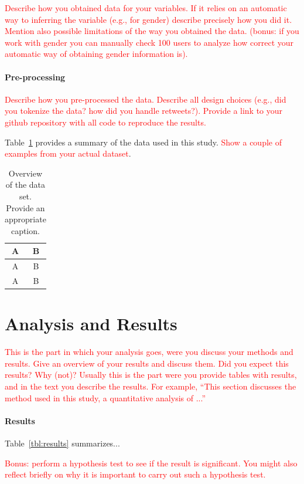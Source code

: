 \documentclass[11pt]{article}
\begin{document}
\textcolor{red}{Describe how you obtained data for your variables. If it relies on an automatic way to inferring the variable (e.g., for gender) describe precisely how you did it. Mention also possible limitations of the way you obtained the data. (bonus: if you work with gender you can manually check 100 users to analyze how correct your automatic way of obtaining gender information is).}

\paragraph{Pre-processing} \textcolor{red}{Describe how you pre-processed the data. Describe all design choices (e.g., did you tokenize the data? how did you handle retweets?). Provide a link to your github repository with all code to reproduce the results.}

Table~\ref{tbl:stats} provides a summary of the data used in this study.  \textcolor{red}{Show a couple of examples from your actual dataset}.
\begin{table}[hbtp]\centering
\begin{tabular}{|cc|}
\hline
A & B \\
\hline
A & B \\
A & B \\
\hline
\end{tabular}
\caption{Overview of the data set. Provide an appropriate caption.}
\label{tbl:stats}
\end{table}




\section{Analysis and Results}



\textcolor{red}{This is the part in which your analysis goes, were you discuss your methods and results. Give an overview of your results and discuss them. Did you expect this results? Why (not)? Usually this is the part were you provide tables with results, and in the text you describe the results. 
For example, ``This section discusses the method used in this study, a quantitative analysis of ...''}
\paragraph{Results} Table~\ref{tbl:results} summarizes...

\textcolor{red}{Bonus: perform a hypothesis test to see if the result is significant. You might also reflect briefly on why it is important to carry out such a hypothesis test.}
\end{document}
